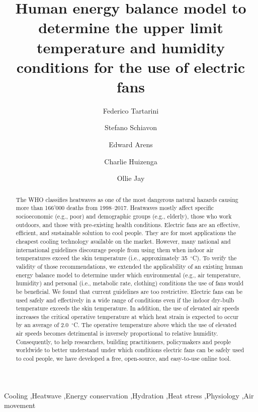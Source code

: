 
\begin{frontmatter}

\title{Human energy balance model to determine the upper limit temperature and humidity conditions for the use of electric fans}

\author[sinBerBest]{Federico Tartarini}
\author[CBE]{Stefano Schiavon}
\author[CBE]{Edward Arens}
\author[CBE]{Charlie Huizenga}
 \author[USYD]{Ollie Jay}

\address[sinBerBest]{SinBerBEST, Berkeley Education Alliance for Research in Singapore, Singapore}
\address[CBE]{Center for the Built Environment, University of California, Berkeley, USA}
 \address[USYD]{Sydney School of Health Sciences, Faculty of Medicine and Health, The University of Sydney, Sydney, Australia}

\begin{abstract}
    The WHO classifies heatwaves as one of the most dangerous natural hazards causing more than 166'000 deaths from 1998--2017.
    Heatwaves mostly affect specific socioeconomic (e.g., poor) and demographic groups (e.g., elderly), those who work outdoors, and those with pre-existing health conditions.
    Electric fans are an effective, efficient, and sustainable solution to cool people.
    They are for most applications the cheapest cooling technology available on the market.
    However, many national and international guidelines discourage people from using them when indoor air temperatures exceed the skin temperature (i.e., approximately 35~$^{\circ}$C\@).
    To verify the validity of those recommendations, we extended the applicability of an existing human energy balance model to determine under which environmental (e.g., air temperature, humidity) and personal (i.e., metabolic rate, clothing) conditions the use of fans would be beneficial.
    We found that current guidelines are too restrictive.
    Electric fans can be used safely and effectively in a wide range of conditions even if the indoor dry-bulb temperature exceeds the skin temperature.
    In addition, the use of elevated air speeds increases the critical operative temperature at which heat strain is expected to occur by an average of 2.0~$^{\circ}$C\@.
    The operative temperature above which the use of elevated air speeds becomes detrimental is inversely proportional to relative humidity.
    Consequently, to help researchers, building practitioners, policymakers and people worldwide to better understand under which conditions electric fans can be safely used to cool people, we have developed a free, open-source, and easy-to-use online tool.
\end{abstract}

\begin{keyword}
Cooling \sep Heatwave \sep Energy conservation \sep Hydration \sep Heat stress \sep Physiology \sep Air movement
\end{keyword}

\end{frontmatter}
